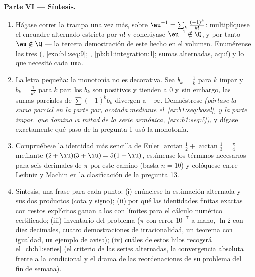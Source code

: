 \begin{problem}
\medskip
\noindent\textbf{Parte VI --- Síntesis.}
\begin{enumerate}[resume]
  \item Hágase correr la trampa una vez más, sobre
        $\eu^{-1} = \sum_k \frac{(-1)^k}{k!}$: multiplíquese el
        encuadre alternado estricto por $n!$ y conclúyase
        $\eu^{-1} \notin \Q$, y por tanto $\eu \notin \Q$ --- la
        tercera demostración de este hecho en el volumen.
        Enumérense las tres (,
        \cref{exo:b1:seq:9}; ,
        \cref{pb:b1:integration:1}; sumas alternadas, aquí) y lo que
        necesitó cada una.
  \item La letra pequeña: la monotonía no es decorativa. Sea
        $b_k = \frac1k$ para $k$ impar y $b_k = \frac{1}{k^2}$ para
        $k$ par: los $b_k$ son positivos y tienden a $0$ y, sin
        embargo, las sumas parciales de $\sum (-1)^k b_k$ divergen a
        $-\infty$. Demuéstrese \emph{(pártase la suma parcial en la
        parte par, acotada mediante el~\cref{ex:b1:seq:basel}, y la
        parte impar, que domina la mitad de la serie armónica,
        \cref{exo:b1:seq:5})}, y dígase exactamente qué paso de la
        pregunta 1 usó la monotonía.
  \item Compruébese la identidad más sencilla de Euler
        $\arctan\frac12 + \arctan\frac13 = \frac\pi4$ mediante
        $(2 + \iu)(3 + \iu) = 5(1 + \iu)$, estímense los términos
        necesarios para seis decimales de $\pi$ por este camino
        (basta $n = 10$) y colóquese entre Leibniz y Machin en la
        clasificación de la pregunta 13.
  \item Síntesis, una frase para cada punto: (i) enúnciese la
        estimación alternada y sus dos productos (cota y signo);
        (ii) por qué las identidades finitas exactas con restos
        explícitos ganan a los  con límites para el
        cálculo numérico certificado; (iii) inventario del problema
        ($\pi$ con error $10^{-7}$ a mano, $\ln 2$ con diez
        decimales, cuatro demostraciones de irracionalidad, un
        teorema con igualdad, un ejemplo de aviso); (iv) cuáles de
        estos hilos recogerá el~\cref{ch:b1:series} (el criterio de
        las series alternadas, la convergencia absoluta frente a la
        condicional y el drama de las reordenaciones de su problema
        del fin de semana).
\end{enumerate}
\end{problem}
